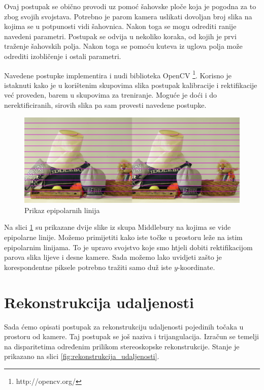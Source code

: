 \documentclass[utf8, zavrsni, numeric]{fer}
\begin{document}
Ovaj postupak se obično provodi uz pomoć šahovske ploče koja je pogodna za to zbog svojih svojstava. Potrebno je parom kamera uslikati dovoljan broj slika na kojima se u potpunosti vidi šahovnica.
Nakon toga se mogu odrediti ranije navedeni parametri. Postupak se odvija u nekoliko koraka, od kojih je prvi traženje šahovskih polja. Nakon toga se pomoću kuteva iz uglova polja može odrediti izobličenje
i ostali parametri.

Navedene postupke implementira i nudi biblioteka OpenCV \footnote{http://opencv.org/}. Korisno je istaknuti kako je u korištenim skupovima slika postupak kalibracije i rektifikacije već proveden, barem u skupovima za treniranje. Moguće je doći i do nerektificiranih, sirovih slika pa sam provesti navedene postupke.

\begin{figure}[htb]
  \centering
  \includegraphics[width=14cm]{img/lines.png}
  \caption{Prikaz epipolarnih linija}
  \label{fig:epipolarne_linije}
\end{figure}

Na slici \ref{fig:epipolarne_linije} su prikazane dvije slike iz skupa Middlebury na kojima
se vide epipolarne linije. Možemo primijetiti kako iste točke u prostoru leže na istim epipolarnim
linijama. To je upravo svojstvo koje smo htjeli dobiti rektifikacijom parova slika lijeve i desne kamere.
Sada možemo lako uvidjeti zašto je korespondentne piksele potrebno tražiti samo duž iste $y$-koordinate.

\section{Rekonstrukcija udaljenosti}
Sada ćemo opisati postupak za rekonstrukciju udaljenosti pojedinih točaka u prostoru od kamere. Taj postupak se još naziva i trijangulacija. Izračun se temelji na disparitetima određenim prilikom stereoskopske rekonstrukcije.
Stanje je prikazano na slici \ref{fig:rekonstrukcija_udaljenosti}.
\end{document}
